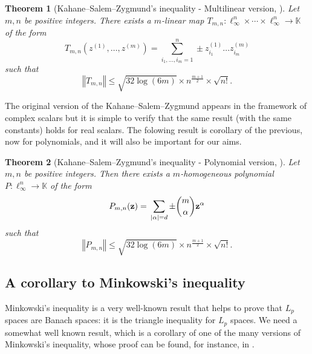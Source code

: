 \documentclass[10pt]{amsart}
\newtheorem{theorem}{Theorem}[section]
\numberwithin{equation}{section}
\begin{document}
\begin{theorem}[Kahane--Salem--Zygmund's inequality - Multilinear version,
\protect\cite{korea}]
\label{novv1} Let $m,n$ be positive integers. There exists a $m$-linear map $\displaystyle T_{m,n}:\ell _{\infty }^{n}\times \cdots \times \ell
_{\infty}^{n}\rightarrow \mathbb{K}$ of the form
\begin{equation*}
\displaystyle T_{m,n}(z^{(1)}, \ldots, z^{(m)})=\sum_{i_{1}, \ldots, i_{m} =
1}^{n}\pm z_{i_{1}}^{(1)} \ldots z_{i_{m}}^{(m)}
\end{equation*}
such that
\begin{equation*}
\left\Vert T_{m,n}\right\Vert \leq \sqrt{32\log \left( 6m\right) }\times n^{\frac{m+1}{2}}\times \sqrt{n!}.
\end{equation*}
\end{theorem}

The original version of the Kahane--Salem--Zygmund appears in the framework
of complex scalars but it is simple to verify that the same result (with the
same constants) holds for real scalars. The folowing result is corollary of
the previous, now for polynomials, and it will also be important for our
aims.

\begin{theorem}[Kahane--Salem--Zygmund's inequality - Polynomial version,
\protect\cite{korea}]
\label{novv2}Let $m,n$ be positive integers. Then there exists a $m$-homogeneous polynomial $P:\ell _{\infty }^{n}\rightarrow \mathbb{K}$ of the
form
\begin{equation*}
P_{m,n}(\mathbf{z})={\textstyle}\sum_{|\alpha |=d}\pm \binom{m}{\alpha }\mathbf{z}^{\alpha }
\end{equation*}such that
\begin{equation*}
\left\Vert P_{m,n}\right\Vert \leq \sqrt{32\log \left( 6m\right) }\times n^{\frac{m+1}{2}}\times \sqrt{n!}.
\end{equation*}
\end{theorem}

\subsection{A corollary to Minkowski's inequality}

Minkowski's inequality is a very well-known result that helps to prove that $L_{p}$ spaces are Banach spaces: it is the triangle inequality for $L_{p}$
spaces. We need a somewhat well known result, which is a corollary of one of
the many versions of Minkowski's inequality, whose proof can be found, for
instance, in \cite{garling}.
\end{document}

